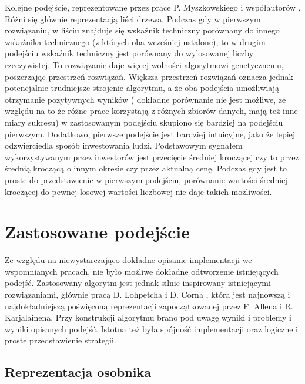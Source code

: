 \documentclass[twoside]{iisthesis}
\begin{document}
Kolejne podejście, reprezentowane przez prace P. Myszkowskiego i współautorów \cite{GPW}\cite{Bicz}, Różni się głównie reprezentacją liści drzewa. Podczas gdy w pierwszym rozwiązaniu, w liściu znajduje się wskaźnik techniczny porównany do innego wskaźnika technicznego (z których oba wcześniej ustalone), to w drugim podejściu wskaźnik techniczny jest porównany do wylosowanej liczby rzeczywistej. To rozwiązanie daje więcej wolności algorytmowi genetycznemu, poszerzając przestrzeń rozwiązań. Większa przestrzeń rozwiązań oznacza jednak potencjalnie trudniejsze strojenie algorytmu, a że oba podejścia umożliwiają otrzymanie pozytywnych wyników ( dokładne porównanie nie jest możliwe, ze względu na to że różne prace korzystają z różnych zbiorów danych, mają też inne miary sukcesu) w zastosowanym podejściu skupiono się bardziej na podejściu pierwszym. Dodatkowo, pierwsze podejście jest bardziej intuicyjne, jako że lepiej odzwierciedla sposób inwestowania ludzi. Podstawowym sygnałem wykorzystywanym przez inwestorów jest przecięcie średniej kroczącej czy to przez średnią kroczącą o innym okresie czy przez aktualną cenę. Podczas gdy jest to proste do przedstawienie w pierwszym podejściu, porównanie wartości średniej kroczącej do pewnej losowej wartości liczbowej nie daje takich możliwości.


\chapter{Zastosowane podejście}

Ze względu na niewystarczająco dokładne opisanie implementacji we wspomnianych pracach, nie było możliwe dokładne odtworzenie istniejących podejść. Zastosowany algorytm jest jednak silnie inspirowany istniejącymi rozwiązaniami, głównie pracą  D. Lohpetcha i D. Corna \cite{5393324}, która jest najnowszą i najdokładniejszą poświęconą reprezentacji zapoczątkowanej przez  F. Allena i R. Karjalainena\cite{Allen1999245}. Przy konstrukcji algorytmu brano pod uwagę wyniki i problemy i wyniki opisanych podejść. Istotna też była spójność implementacji oraz logiczne i proste przedstawienie strategii.


\section{Reprezentacja osobnika}
\end{document}
